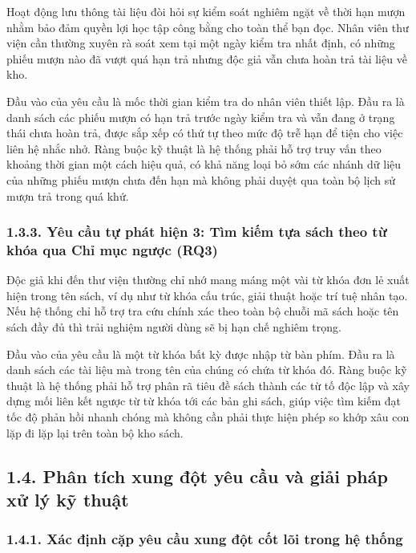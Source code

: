 \documentclass[14pt,a4paper]{extarticle}
\begin{document}
Hoạt động lưu thông tài liệu đòi hỏi sự kiểm soát nghiêm ngặt về thời hạn mượn nhằm bảo đảm quyền lợi học tập công bằng cho toàn thể bạn đọc. Nhân viên thư viện cần thường xuyên rà soát xem tại một ngày kiểm tra nhất định, có những phiếu mượn nào đã vượt quá hạn trả nhưng độc giả vẫn chưa hoàn trả tài liệu về kho.

Đầu vào của yêu cầu là mốc thời gian kiểm tra do nhân viên thiết lập. Đầu ra là danh sách các phiếu mượn có hạn trả trước ngày kiểm tra và vẫn đang ở trạng thái chưa hoàn trả, được sắp xếp có thứ tự theo mức độ trễ hạn để tiện cho việc liên hệ nhắc nhở. Ràng buộc kỹ thuật là hệ thống phải hỗ trợ truy vấn theo khoảng thời gian một cách hiệu quả, có khả năng loại bỏ sớm các nhánh dữ liệu của những phiếu mượn chưa đến hạn mà không phải duyệt qua toàn bộ lịch sử mượn trả trong quá khứ.

\subsubsection*{1.3.3. Yêu cầu tự phát hiện 3: Tìm kiếm tựa sách theo từ khóa qua Chỉ mục ngược (RQ3)}

Độc giả khi đến thư viện thường chỉ nhớ mang máng một vài từ khóa đơn lẻ xuất hiện trong tên sách, ví dụ như từ khóa cấu trúc, giải thuật hoặc trí tuệ nhân tạo. Nếu hệ thống chỉ hỗ trợ tra cứu chính xác theo toàn bộ chuỗi mã sách hoặc tên sách đầy đủ thì trải nghiệm người dùng sẽ bị hạn chế nghiêm trọng.

Đầu vào của yêu cầu là một từ khóa bất kỳ được nhập từ bàn phím. Đầu ra là danh sách các tài liệu mà trong tên của chúng có chứa từ khóa đó. Ràng buộc kỹ thuật là hệ thống phải hỗ trợ phân rã tiêu đề sách thành các từ tố độc lập và xây dựng mối liên kết ngược từ từ khóa tới các bản ghi sách, giúp việc tìm kiếm đạt tốc độ phản hồi nhanh chóng mà không cần phải thực hiện phép so khớp xâu con lặp đi lặp lại trên toàn bộ kho sách.

\subsection*{1.4. Phân tích xung đột yêu cầu và giải pháp xử lý kỹ thuật}

\subsubsection*{1.4.1. Xác định cặp yêu cầu xung đột cốt lõi trong hệ thống}
\end{document}
